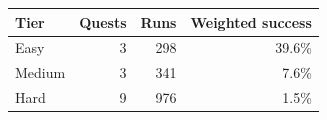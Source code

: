 \begin{tabular}{lrrr}
\toprule
Tier & Quests & Runs & Weighted success \\
\midrule
Easy & 3 & 298 & 39.6\% \\
Medium & 3 & 341 & 7.6\% \\
Hard & 9 & 976 & 1.5\% \\
\bottomrule
\end{tabular}
